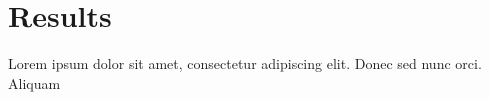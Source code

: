\chapter{Results}
\label{cha:results}
Lorem ipsum dolor sit amet, consectetur adipiscing elit. Donec sed nunc orci. Aliquam

\clearpage
